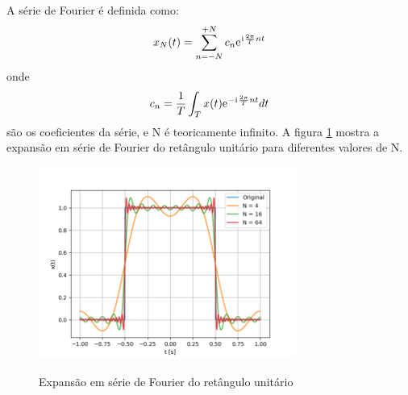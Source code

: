 \documentclass[12pt,a4paper]{report}
\newcommand{\I}{{\mathrm{i}\mkern1mu}}
\newcommand{\euler}{{\mathrm{e}\mkern1mu}}
\begin{document}
  A série de Fourier é definida como:
  \begin{equation}
    x_N(t) = \sum_{n = -N}^{+N} c_n \euler^{\I \frac{2 \pi}{T} n t}
  \end{equation}
  onde
  \begin{equation}
    c_n = \frac{1}{T} \int_T x(t) \euler^{-\I \frac{2 \pi}{T} n t} dt
  \end{equation}
  são os coeficientes da série, e N é teoricamente infinito. A figura \ref{fig:fourier} mostra a expansão
  em série de Fourier do retângulo unitário para diferentes valores de N.
  \begin{figure}[H]
    \caption{Expansão em série de Fourier do retângulo unitário}
    \centering
    \includegraphics[width=0.75\textwidth]{fourier_series}
    \label{fig:fourier}
  \end{figure}
\end{document}
